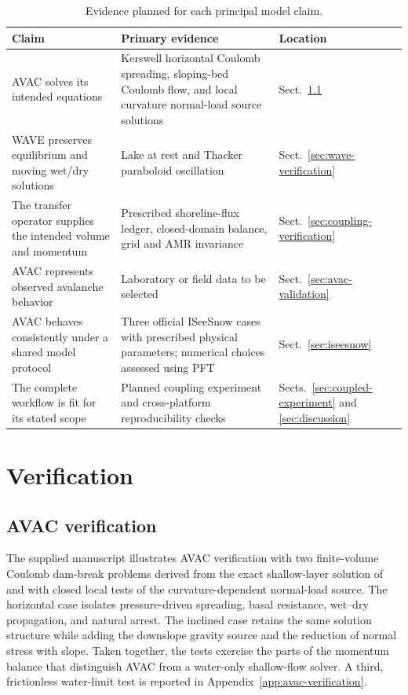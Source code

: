 \documentclass[11pt,a4paper]{article}
\begin{document}
\begin{table}[htbp]
\centering
\caption{Evidence planned for each principal model claim.}
\label{tab:evidence-matrix}
\begin{tabularx}{\textwidth}{@{}p{}X p{}@{}}
\toprule
Claim & Primary evidence & Location \\
\midrule
AVAC solves its intended equations & Kerswell horizontal Coulomb spreading,
sloping-bed Coulomb flow, and local curvature normal-load source solutions &
Sect.~\ref{sec:avac-verification} \\
WAVE preserves equilibrium and moving wet/dry solutions & Lake at rest and
Thacker paraboloid oscillation & Sect.~\ref{sec:wave-verification} \\
The transfer operator supplies the intended volume and momentum & Prescribed
shoreline-flux ledger, closed-domain balance, grid and AMR invariance &
Sect.~\ref{sec:coupling-verification} \\
AVAC represents observed avalanche behavior & Laboratory or field data to be
selected & Sect.~\ref{sec:avac-validation} \\
AVAC behaves consistently under a shared model protocol & Three official
ISeeSnow cases with prescribed physical parameters; numerical choices assessed
using PFT & Sect.~\ref{sec:iseesnow} \\
The complete workflow is fit for its stated scope & Planned coupling experiment
and cross-platform reproducibility checks & Sects.~\ref{sec:coupled-experiment}
and \ref{sec:discussion} \\
\bottomrule
\end{tabularx}
\end{table}






\newpage
\section{Verification}
\label{sec:verification}

\subsection{AVAC verification}
\label{sec:avac-verification}

The supplied manuscript illustrates AVAC verification with two finite-volume Coulomb dam-break problems derived
from the exact shallow-layer solution of \citet{Kerswell2005} and with
closed local tests of the curvature-dependent normal-load source. The horizontal
case isolates pressure-driven spreading, basal resistance, wet--dry
propagation, and natural arrest.  The inclined case retains the same solution
structure while adding the downslope gravity source and the reduction of
normal stress with slope.  Taken together, the tests exercise the parts of
the momentum balance that distinguish AVAC from a water-only shallow-flow
solver.  A third, frictionless water-limit test is reported in
Appendix~\ref{app:avac-verification}.
\end{document}
